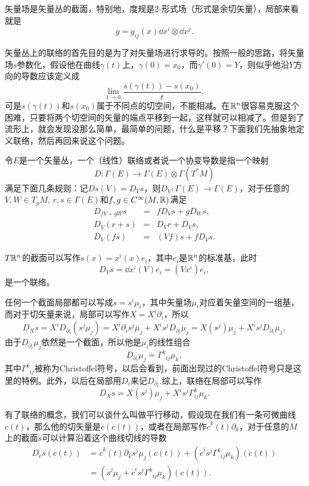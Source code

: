 矢量场是矢量丛的截面，特别地，度规是2-形式场（形式是余切矢量），局部来看就是
\[
	g=g_{ij}(x)\dd x^i\otimes \dd x^j.
\]

矢量丛上的联络的首先目的是为了对矢量场进行求导的。按照一般的思路，将矢量场$s$参数化，假设他在曲线$\gamma(t)$上，$\gamma(0)=x_0$，而$\gamma'(0)=Y$，则似乎他沿$Y$方向的导数应该定义成
\[
	\lim_{t\to 0}\frac{s(\gamma(t))-s(x_0)}{t},
\]
可是$s(\gamma(t))$和$s(x_0)$属于不同点的切空间，不能相减。在$\mathbb{R}^n$很容易克服这个困难，只要将两个切空间的矢量的端点平移到一起，这样就可以相减了。但是到了流形上，就会发现没那么简单，最简单的问题，什么是平移？下面我们先抽象地定义联络，然后再回来说这个问题。

\para 令$E$是一个矢量丛，一个（线性）联络或者说一个协变导数是指一个映射
\[
	D:\Gamma (E)\to\Gamma(E)\otimes \Gamma(T^*M)
\]
满足下面几条规则：记$Ds(V)=D_Vs$，则$D_V:\Gamma (E)\to\Gamma(E)$，对于任意的$V,W\in T_p M$, $r,s\in \Gamma (E)$和$f,g\in C^\infty(M,\mathbb{R})$满足
\[
\begin{array}{lcl} 
	D_{fV+gW}s &=& fD_Vs+gD_W s,\\
	D_V(r+s)   &=& D_Vr+D_Vs,\\
	D_V(fs)    &=& (Vf)s+fD_Vs.
\end{array}
\]

$T\mathbb{R}^n$的截面可以写作$s(x)=x^i(x)e_i$，其中$e_i$是$\mathbb{R}^n$的标准基，此时
\[
	D_Vs=\dd x^i(V) e_i=(Vx^i)e_i,
\]
是一个联络。

任何一个截面局部都可以写成$s=s^i\mu_i$，其中矢量场$\mu_i$对应着矢量空间的一组基，而对于切矢量来说，局部可以写作$X=X^i\partial_i$，所以
\[
	D_Xs=X^iD_{\partial_i}(s^j\mu_j)=X^i\partial_i s^j\mu_j+X^is^jD_{\partial_i}\mu_j=X(s^j)\mu_j+X^is^jD_{\partial_i}\mu_j,
\]
由于$D_{\partial_i}\mu_j$依然是一个截面，所以他是$\mu_i$的线性组合
\[
	D_{\partial_i}\mu_j=\Gamma^k_{\phantom{k}ij}\mu_k,
\]
其中$\Gamma^k_{\phantom{k}ij}$被称为Christoffel符号，以后会看到，前面出现过的Christoffel符号只是这里的特例。此外，以后在局部用$D_i$来记$D_{\partial_i}$.综上，联络在局部可以写作
\[
	D_Xs=X(s^j)\mu_j+X^is^j\Gamma^{k}_{ij}\mu_k.
\]

有了联络的概念，我们可以谈什么叫做平行移动，假设现在我们有一条可微曲线$c(t)$，那么他的切矢量是$\dot{c}(c(t))$，或者在局部写作$\dot{c}^k(t)\partial_k$，对于任意的$M$上的截面$s$可以计算沿着这个曲线切线的导数
\begin{align*}
	D_{\dot{c}}s(c(t))&=\dot{c}^k(t)\partial_ks^j\mu_j(c(t))+(\dot{c}^i s^j\Gamma^k_{\phantom{k}ij}\mu_k)(c(t))\\
	&=\left(\dot{s}^j\mu_j+\dot{c}^i s^j\Gamma^k_{\phantom{k}ij}\mu_k\right)(c(t)).
\end{align*}

